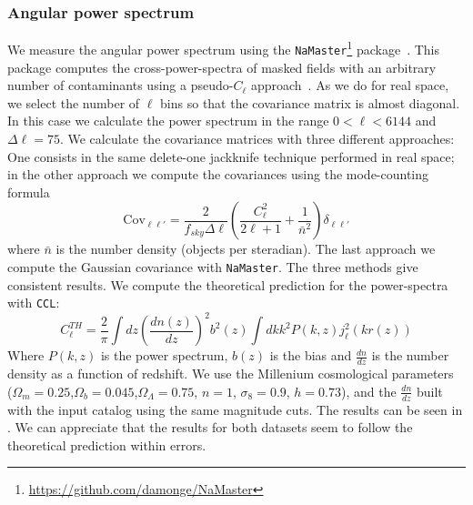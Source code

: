 \documentclass[\docopts]{\docclass}
\begin{document}
\subsubsection{Angular power spectrum}
We measure the angular power spectrum using the \texttt{NaMaster}\footnote{\url{https://github.com/damonge/NaMaster}} package~\citep{Namaster}. This package computes the cross-power-spectra of masked fields with an arbitrary number of contaminants using a pseudo-$C_{\ell}$ approach~\citep{2002ApJ...567....2H,2017MNRAS.465.1847E}. As we do for real space, we select the number of $\ell$ bins so that the covariance matrix is almost diagonal. In this case we calculate the power spectrum in the range $0 < \ell < 6144$ and $\Delta \ell = 75$. We calculate the covariance matrices with three different approaches: One consists in the same delete-one jackknife technique performed in real space; in the other approach we compute the covariances using the mode-counting formula~\citep{Dodelson:1282338,2007MNRAS.381.1347C}
\begin{equation}
\mathrm{Cov}_{\ell\ell'}=\frac{2}{f_{sky}\Delta\ell}\left(\frac{C_{\ell}^{2}}{2\ell+1}+\frac{1}{\bar{n}^{2}}\right)\delta_{\ell\ell'}
\end{equation}
where $\bar{n}$ is the number density (objects per steradian). The last approach we compute the Gaussian covariance with \texttt{NaMaster}. The three methods give consistent results. We compute the theoretical prediction for the power-spectra with \texttt{CCL}:
\begin{equation}
C_{\ell}^{TH} = \frac{2}{\pi}\int{dz} \left(\frac{dn(z)}{dz}\right)^{2} b^{2}(z) \int{dk k^{2} P(k,z)j^{2}_{\ell}(kr(z))}
\end{equation}
Where $P(k,z)$ is the power spectrum, $b(z)$ is the bias and $\frac{dn}{dz}$ is the number density as a function of redshift. We use the Millenium cosmological parameters~\citep{2005Nature.435.629S} ($\Omega_{m}=0.25$,$\Omega_{b}=0.045$,$\Omega_{\Lambda}=0.75$, $n=1$, $\sigma_{8}=0.9$, $h=0.73$), and the $\frac{dn}{dz}$ built with the input catalog using the same magnitude cuts. The results can be seen in . We can appreciate that the results for both datasets seem to follow the theoretical prediction within errors.
\end{document}
